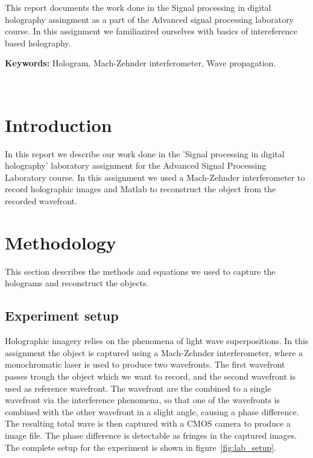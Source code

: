 \documentclass[12pt,a4paper,english
]{tunithesis}
\begin{document}
\vspace{0.5cm}


\noindent
This report documents the work done in the Signal processing in digital holography assingment as a part of the Advanced signal processing laboratory course. In this assignment we familiazired ourselves with basics of intereference based holography.
~

\noindent\textbf{Keywords:} Hologram, Mach-Zehnder interferometer, Wave propagation.

~




\setcounter{tocdepth}{3}              %
\tableofcontents                      %


\if@twoside
\cleardoublepage
\fi


\renewcommand{\chaptername}{} %


\chapter{Introduction}
\label{ch:intro}
In this report we describe our work done in the 'Signal processing in digital holography' laboratory assignment for the Advanced Signal Processing Laboratory course. In this assignment we used a Mach-Zehnder interferometer to record holographic images and Matlab to reconstruct the object from the recorded wavefront.

\setcounter{page}{1} 

\chapter{Methodology}
This section describes the methods and equations we used to capture the holograms and reconstruct the objects.

\label{sec:methodology}
\section{Experiment setup}
Holographic imagery relies on the phenomena of light wave superpositions. In this assignment the object is captured using a Mach-Zehnder interferometer, where a monochromatic laser is used to produce two wavefronts. The first wavefront passes trough the object which we want to record, and the second wavefront is used as reference wavefront. The wavefront are the combined to a single wavefront via the interference phenomena, so that one of the wavefronts is combined with the other wavefront in a slight angle, causing a phase difference. The resulting total wave is then captured with a CMOS camera to produce a image file. The phase difference is detectable as fringes in the captured images. The complete setup for the experiment is shown in figure~\ref{fig:lab_setup}.
\end{document}
